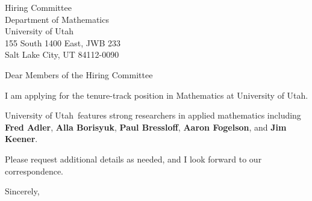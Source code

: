 




	
	
	\def\School{University of Utah}
	
	\begin{letter}
		{Hiring Committee\\
			Department of Mathematics\\
			University of Utah\\
			155 South 1400 East, JWB 233\\
			Salt Lake City, UT 84112-0090
			
		}
		
		\opening{Dear Members of the Hiring Committee}
		
		
		I am applying for the tenure-track position in Mathematics at \School. 
		
		\School~features strong researchers in applied mathematics including \textbf{Fred Adler}, \textbf{Alla Borisyuk}, \textbf{Paul Bressloff}, \textbf{Aaron Fogelson}, and \textbf{Jim Keener}. 
		
		
		
		
		
		Please request additional details as needed, and I look forward to our correspondence.
		
		\closing{Sincerely,}
	\end{letter}
